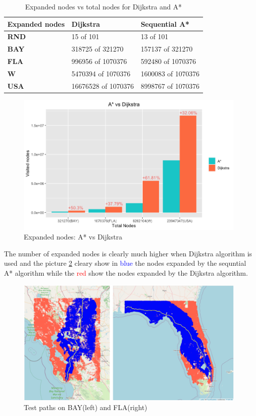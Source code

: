 \documentclass[twocolumn, switch]{article} %
\begin{document}
\begin{table}[ht!]
  \caption{Expanded nodes vs total nodes for Dijkstra and A*}
  \begin{tabular}{|l|l|l|}
  \hline
  \textbf{Expanded nodes} & \textbf{Dijkstra} & \textbf{Sequential A*}       \\ \hline
  \textbf{RND}            & 15 of 101           & 13 of 101         \\ \hline
  \textbf{BAY}            & 318725 of 321270    & 157137 of 321270  \\ \hline
  \textbf{FLA}            & 996956 of 1070376   & 592480 of 1070376 \\ \hline
  \textbf{W}              & 5470394 of 1070376  & 1600083 of 1070376 \\ \hline
  \textbf{USA}            & 16676528 of 1070376 & 8998767 of 1070376 \\ \hline
  \end{tabular}
\end{table}
\begin{figure}[ht!]
  \centering
  \includegraphics[width=1\linewidth]{astar_dijkstra/expanded_nodes.png}
  \caption{Expanded nodes: A* vs Dijkstra}
  \label{histogramnodes}
\end{figure}
The number of expanded nodes is clearly much higher when Dijkstra algorithm is used and the picture
\ref{astardijkstramap} cleary show in \textcolor{blue}{blue} the nodes expanded by the sequntial A* algorithm
while the \textcolor{red}{red} show the nodes expanded by the Dijkstra algorithm.
\begin{figure}[ht!]
  \centering
  \includegraphics[width=1\linewidth]{dijkstra_astar.png}
  \caption{Test paths on BAY(left) and FLA(right)}
  \label{astardijkstramap}
\end{figure}
\end{document}
